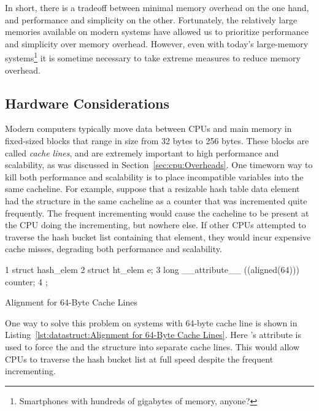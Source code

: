 In short, there is a tradeoff between minimal memory overhead on
the one hand, and performance and simplicity on the other.
Fortunately, the relatively large memories available on modern
systems have allowed us to prioritize performance and simplicity
over memory overhead.
However, even with today's large-memory systems\footnote{
	Smartphones with hundreds of gigabytes of memory, anyone?}
it is sometime necessary to take extreme measures to reduce
memory overhead.

\subsection{Hardware Considerations}
\label{sec:datastruct:Hardware Considerations}

Modern computers typically move data between CPUs and main memory in
fixed-sized blocks that range in size from 32 bytes to 256 bytes.
These blocks are called \emph{cache lines}, and are extremely important
to high performance and scalability, as was discussed in
Section~\ref{sec:cpu:Overheads}.
One timeworn way to kill both performance and scalability is to
place incompatible variables into the same cacheline.
For example, suppose that a resizable hash table data element had
the  structure in the same cacheline as a counter that
was incremented quite frequently.
The frequent incrementing would cause the cacheline to be present at
the CPU doing the incrementing, but nowhere else.
If other CPUs attempted to traverse the hash bucket list containing
that element, they would incur expensive cache misses, degrading both
performance and scalability.

\begin{listing}[tb]
{ \scriptsize
\begin{verbbox}
1 struct hash_elem {
2   struct ht_elem e;
3   long __attribute__ ((aligned(64))) counter;
4 };
\end{verbbox}
}
\centering
\theverbbox
\caption{Alignment for 64-Byte Cache Lines}
\label{lst:datastruct:Alignment for 64-Byte Cache Lines}
\end{listing}

One way to solve this problem on systems with 64-byte cache line is shown in
Listing~\ref{lst:datastruct:Alignment for 64-Byte Cache Lines}.
Here \GCC's  attribute is used to force the 
and the  structure into separate cache lines.
This would allow CPUs to traverse the hash bucket list at full speed
despite the frequent incrementing.


